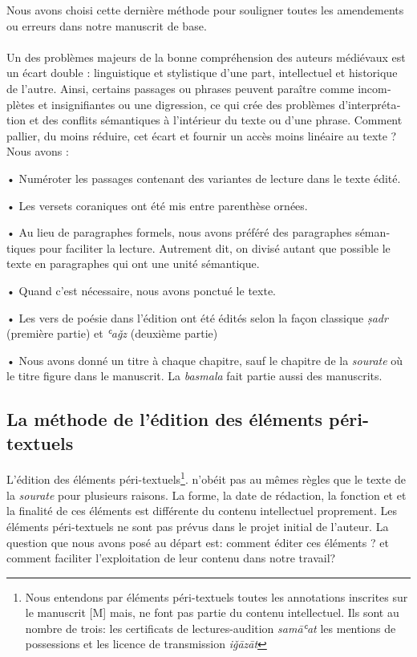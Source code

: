 \documentclass[a4paper,12pt]{report}
\begin{document}
\begin{itemize}
\begin{enumerate}
\begin{french}
\begin{french}
\begin{itemize}
\end{itemize}

Nous avons choisi cette dernière méthode pour souligner toutes les amendements ou erreurs dans notre manuscrit de base. 
\paragraph{}
Un des problèmes majeurs de la bonne compréhension des auteurs médiévaux est un  écart double : linguistique et stylistique d’une part, intellectuel et historique de l’autre. Ainsi, certains passages ou phrases peuvent paraître comme incomplètes et insignifiantes ou une digression,  ce qui crée des problèmes d’interprétation et des conflits sémantiques à l’intérieur du texte ou d'une phrase.  Comment pallier, du moins réduire, cet écart  et  fournir un accès moins linéaire  au texte ? Nous avons  :

•   Numéroter les passages contenant des variantes de lecture dans le texte édité. 

 •  Les versets coraniques ont été mis entre  parenthèse ornées.

 • Au lieu de paragraphes formels, nous avons préféré des paragraphes sémantiques  pour faciliter la lecture. Autrement dit, on divisé autant que possible le texte en paragraphes qui ont une unité sémantique. 

• Quand c'est nécessaire, nous avons ponctué le texte. 

• Les vers de poésie dans l'édition ont été édités selon la façon classique\textit{ ṣadr} (première partie)  et \textit{ʿaǧz } (deuxième partie)

• Nous avons donné un titre à chaque chapitre, sauf le chapitre de la \textit{sourate} où le titre   figure dans le manuscrit. La \textit{basmala}  fait partie aussi des manuscrits.  
 

\end{french}
 
\subsection{La méthode de l’édition des éléments péri-textuels}

L’édition des éléments péri-textuels\footnote{Nous entendons par éléments péri-textuels toutes les annotations inscrites sur le manuscrit [M] mais,  ne font pas partie du contenu intellectuel.  Ils sont au nombre de trois: les certificats de lectures-audition \textit{samāʿat} les mentions de possessions et les licence de transmission \textit{iǧāzāt }}.
n’obéit pas au mêmes règles que le texte de la\textit{ sourate} pour plusieurs raisons.  La  forme, la date de rédaction, la fonction et et la finalité de ces éléments est différente du contenu intellectuel proprement. Les éléments péri-textuels ne sont pas prévus dans le projet initial de l'auteur.  La question que nous avons posé au départ est: comment éditer ces éléments ? et comment faciliter  l'exploitation de leur contenu dans notre travail?  


\end{french}
\end{enumerate}
\end{itemize}
\end{document}
